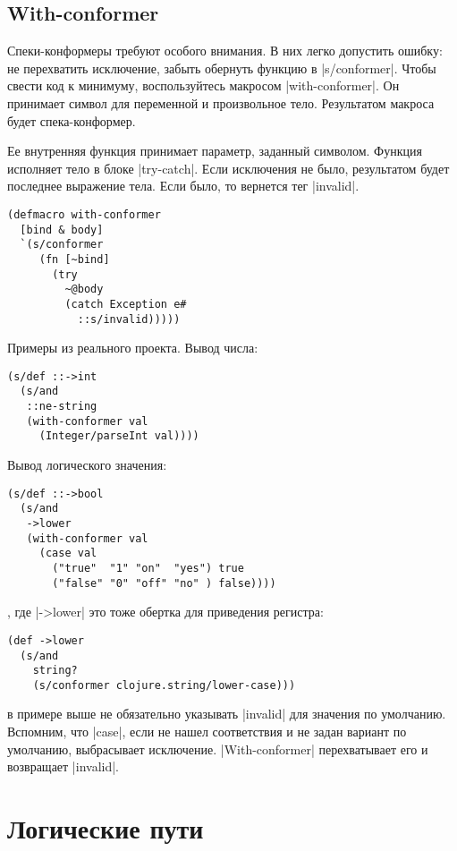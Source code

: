 \subsection{With-conformer}

Спеки-конформеры требуют особого внимания. В них легко допустить ошибку: не
перехватить исключение, забыть обернуть функцию в \spverb|s/conformer|. Чтобы свести
код к минимуму, воспользуйтесь макросом \spverb|with-conformer|. Он принимает символ
для переменной и произвольное тело. Результатом макроса будет спека-конформер.

Ее внутренняя функция принимает параметр, заданный символом. Функция исполняет
тело в блоке \spverb|try-catch|. Если исключения не было, результатом будет последнее
выражение тела. Если было, то вернется тег \spverb|invalid|.

\begin{verbatim}
(defmacro with-conformer
  [bind & body]
  `(s/conformer
     (fn [~bind]
       (try
         ~@body
         (catch Exception e#
           ::s/invalid)))))
\end{verbatim}

Примеры из реального проекта. Вывод числа:

\begin{verbatim}
(s/def ::->int
  (s/and
   ::ne-string
   (with-conformer val
     (Integer/parseInt val))))
\end{verbatim}

Вывод логического значения:

\begin{verbatim}
(s/def ::->bool
  (s/and
   ->lower
   (with-conformer val
     (case val
       ("true"  "1" "on"  "yes") true
       ("false" "0" "off" "no" ) false))))
\end{verbatim}

, где \spverb|->lower| это тоже обертка для приведения регистра:

\begin{verbatim}
(def ->lower
  (s/and
    string?
    (s/conformer clojure.string/lower-case)))
\end{verbatim}

в примере выше не обязательно указывать \spverb|invalid| для значения по
умолчанию. Вспомним, что \spverb|case|, если не нашел соответствия и не задан вариант
по умолчанию, выбрасывает исключение. \spverb|With-conformer| перехватывает его и
возвращает \spverb|invalid|.

\section{Логические пути}

